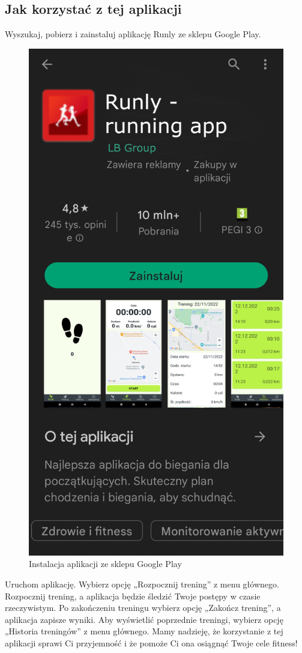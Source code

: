 \subsection{Jak korzystać z tej aplikacji}

Wyszukaj, pobierz i zainstaluj aplikację Runly ze sklepu Google Play.

\begin{figure}[!htb]
	\centering
	\includegraphics[width=.4\linewidth]{rys/runlyPS.png}
	\caption{Instalacja aplikacji ze sklepu Google Play}
	\label{rys:rysunek001epi}
\end{figure}

Uruchom aplikację.
Wybierz opcję „Rozpocznij trening” z menu głównego.
Rozpocznij trening, a aplikacja będzie śledzić Twoje postępy w czasie rzeczywistym.
Po zakończeniu treningu wybierz opcję „Zakończ trening”, a aplikacja zapisze wyniki.
Aby wyświetlić poprzednie treningi, wybierz opcję „Historia treningów” z menu głównego.
Mamy nadzieję, że korzystanie z tej aplikacji sprawi Ci przyjemność i że pomoże Ci ona osiągnąć Twoje cele fitness!


